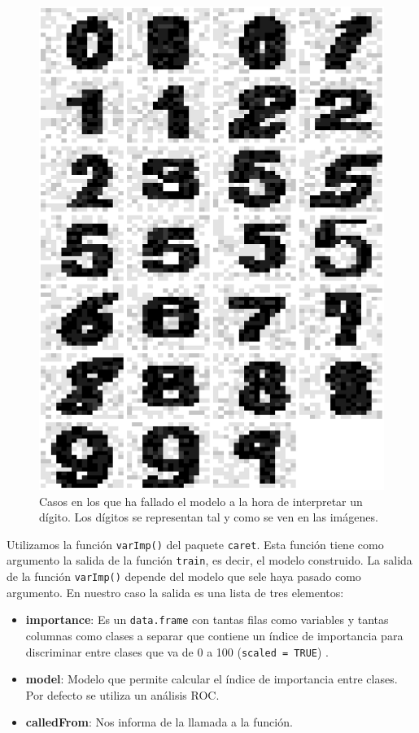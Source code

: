 \documentclass[12pt,spanish,a4paper]{article}
\numberwithin{equation}{section}
\begin{document}
\begin{figure}[h]

{\centering \includegraphics[width=0.8\linewidth]{graphics/svm/digitos_fallados_modelo_svm_linear2_paso1_b-1} 

}

\caption{Casos en los que ha fallado el modelo a la hora de interpretar un dígito. Los dígitos se representan tal y como se ven en las imágenes.}\label{fig:digitos_fallados_modelo_svm_linear2_paso1_b}
\end{figure}

Utilizamos la función \texttt{varImp()} del paquete \texttt{caret}. Esta
función tiene como argumento la salida de la función \texttt{train}, es
decir, el modelo construido. La salida de la función \texttt{varImp()}
depende del modelo que sele haya pasado como argumento. En nuestro caso
la salida es una lista de tres elementos:

\begin{itemize}
\item
  \textbf{importance}: Es un \texttt{data.frame} con tantas filas como
  variables y tantas columnas como clases a separar que contiene un
  índice de importancia para discriminar entre clases que va de 0 a 100
  (\texttt{scaled\ =\ TRUE}) .
\item
  \textbf{model}: Modelo que permite calcular el índice de importancia
  entre clases. Por defecto se utiliza un análisis ROC.
\item
  \textbf{calledFrom}: Nos informa de la llamada a la función.
\end{itemize}
\end{document}
